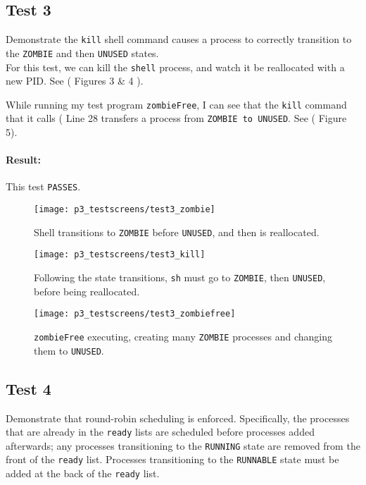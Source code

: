 \documentclass[11pt,letterpaper]{report}
\begin{document}
 	\subsection{Test 3}
 	Demonstrate the {\tt kill} shell command causes a process to correctly transition to the {\tt ZOMBIE} and then {\tt UNUSED} states.\\
 	
 	For this test, we can kill the {\tt shell} process, and watch it be reallocated with a new PID. See ({\color{red} Figures 3 \& 4 }).
 	
 	While running my test program {\tt zombieFree}, I can see that the {\tt kill} command that it calls ({\color{red} Line 28} transfers a process from {\tt ZOMBIE to UNUSED}. See ({\color{red} Figure 5}). 
 	
 	\paragraph{Result:} This test {\tt PASSES}.
 	
\begin{figure}
	\centering
	\texttt{[image: p3\_testscreens/test3\_zombie]}
	\caption{Shell transitions to {\tt ZOMBIE} before {\tt UNUSED}, and then is reallocated.}
	\label{fig:test3zombie}
\end{figure}

\begin{figure}
	\centering
	\texttt{[image: p3\_testscreens/test3\_kill]}
	\caption{Following the state transitions, {\tt sh} must go to {\tt ZOMBIE}, then {\tt UNUSED}, before being reallocated.}
	\label{fig:test3kill}
\end{figure}

\begin{figure}
	\centering
	\texttt{[image: p3\_testscreens/test3\_zombiefree]}
	\caption{{\tt zombieFree} executing, creating many {\tt ZOMBIE} processes and changing them to {\tt UNUSED}.}
	\label{fig:test3zombiefree}
\end{figure}
 	
 	\subsection{Test 4}
 	Demonstrate that round-robin scheduling is enforced. Specifically, the processes that are already in the {\tt ready} lists are scheduled before processes added afterwards; any processes transitioning to the {\tt RUNNING} state are removed from the front of the {\tt ready} list. Processes transitioning to the {\tt RUNNABLE} state must be added at the back of the {\tt ready} list.
 	
\end{document}
